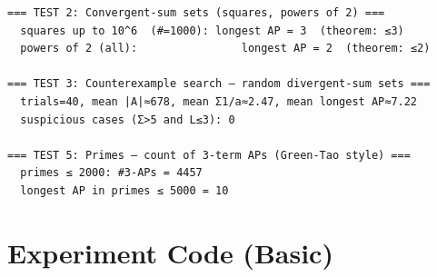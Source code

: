\documentclass[11pt]{article}
\begin{document}
\begin{lstlisting}
=== TEST 2: Convergent-sum sets (squares, powers of 2) ===
  squares up to 10^6  (#=1000): longest AP = 3  (theorem: ≤3)
  powers of 2 (all):                longest AP = 2  (theorem: ≤2)

=== TEST 3: Counterexample search — random divergent-sum sets ===
  trials=40, mean |A|≈678, mean Σ1/a≈2.47, mean longest AP≈7.22
  suspicious cases (Σ>5 and L≤3): 0

=== TEST 5: Primes — count of 3-term APs (Green-Tao style) ===
  primes ≤ 2000: #3-APs = 4457
  longest AP in primes ≤ 5000 = 10

\end{lstlisting}


\section{Experiment Code (Basic)}
\end{document}
